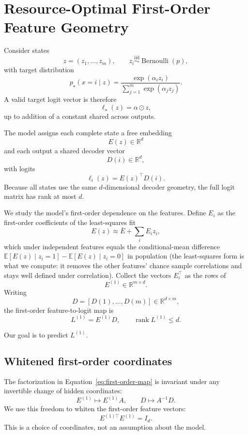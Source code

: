 \section{Resource-Optimal First-Order Feature Geometry}
\label{sec:first-order-geometry}

Consider states
\[
z=(z_1,\ldots,z_m),
\qquad
z_i\overset{\mathrm{iid}}{\sim}\operatorname{Bernoulli}(p),
\]
with target distribution
\[
p_\star(x=i\mid z)
=
\frac{\exp(\alpha_i z_i)}
{\sum_{j=1}^m\exp(\alpha_j z_j)}.
\]
A valid target logit vector is therefore
\[
\ell_\star(z)=\alpha\odot z,
\]
up to addition of a constant shared across outputs.

The model assigns each complete state a free embedding
\[
E(z)\in\mathbb R^d
\]
and each output a shared decoder vector
\[
D(i)\in\mathbb R^d,
\]
with logits
\[
\ell_i(z)=E(z)^\top D(i).
\]
Because all states use the same \(d\)-dimensional decoder geometry, the full logit
matrix has rank at most \(d\).

We study the model's first-order dependence on the features. Define \(E_i\) as the
first-order coefficients of the least-squares fit
\[
E(z)\approx \bar E+\sum_i E_i z_i ,
\]
which under independent features equals the conditional-mean difference
\(\mathbb E[E(z)\mid z_i=1]-\mathbb E[E(z)\mid z_i=0]\) in population (the least-squares
form is what we compute: it removes the other features' chance sample correlations and
stays well defined under correlation). Collect the vectors \(E_i^\top\) as the rows of
\[
E^{(1)}\in\mathbb R^{m\times d}.
\]
Writing
\[
D=[D(1),\ldots,D(m)]\in\mathbb R^{d\times m},
\]
the first-order feature-to-logit map is
\begin{equation}
\boxed{
L^{(1)}=E^{(1)}D,
\qquad
\operatorname{rank}L^{(1)}\le d.
}
\label{eq:first-order-map}
\end{equation}

Our goal is to predict \(L^{(1)}\).

\subsection{Whitened first-order coordinates}

The factorization in Equation~\eqref{eq:first-order-map} is invariant under any
invertible change of hidden coordinates:
\[
E^{(1)}\mapsto E^{(1)}A,
\qquad
D\mapsto A^{-1}D.
\]
We use this freedom to whiten the first-order feature vectors:
\begin{equation}
\boxed{
E^{(1)\top}E^{(1)}=I_d.
}
\label{eq:whitened-gauge}
\end{equation}
This is a choice of coordinates, not an assumption about the model.

